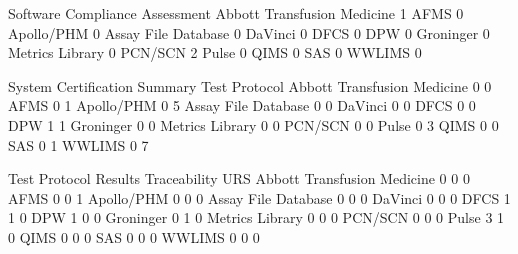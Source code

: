 \documentclass{article}
\begin{document}
\begin{Schunk}
\begin{Soutput}
                              Software Compliance Assessment
  Abbott Transfusion Medicine                              1
  AFMS                                                     0
  Apollo/PHM                                               0
  Assay File Database                                      0
  DaVinci                                                  0
  DFCS                                                     0
  DPW                                                      0
  Groninger                                                0
  Metrics Library                                          0
  PCN/SCN                                                  2
  Pulse                                                    0
  QIMS                                                     0
  SAS                                                      0
  WWLIMS                                                   0
                             
                              System Certification Summary Test Protocol
  Abbott Transfusion Medicine                            0             0
  AFMS                                                   0             1
  Apollo/PHM                                             0             5
  Assay File Database                                    0             0
  DaVinci                                                0             0
  DFCS                                                   0             0
  DPW                                                    1             1
  Groninger                                              0             0
  Metrics Library                                        0             0
  PCN/SCN                                                0             0
  Pulse                                                  0             3
  QIMS                                                   0             0
  SAS                                                    0             1
  WWLIMS                                                 0             7
                             
                              Test Protocol Results Traceability URS
  Abbott Transfusion Medicine                     0            0   0
  AFMS                                            0            0   1
  Apollo/PHM                                      0            0   0
  Assay File Database                             0            0   0
  DaVinci                                         0            0   0
  DFCS                                            1            1   0
  DPW                                             1            0   0
  Groninger                                       0            1   0
  Metrics Library                                 0            0   0
  PCN/SCN                                         0            0   0
  Pulse                                           3            1   0
  QIMS                                            0            0   0
  SAS                                             0            0   0
  WWLIMS                                          0            0   0
                             

\end{Soutput}
\end{Schunk}
\end{document}
